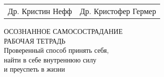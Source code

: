 
\begin{titlepage}	
	\begin{center}	
		\vfill
		\begin{tabularx}{\textwidth}{Xr}
			Др. Кристин Нефф & Др. Кристофер Гермер \\
		\end{tabularx}	
		
		\vfill
		{\Huge ОСОЗНАННОЕ САМОСОСТРАДАНИЕ\\[1cm]}
		{\Large РАБОЧАЯ ТЕТРАДЬ\\[2cm]}
		{\Large Проверенный способ принять себя,\\ найти в себе внутреннюю силу\\ и преуспеть в жизни\\}
		
		\vfill
		\vfill
	\end{center}
\end{titlepage}
